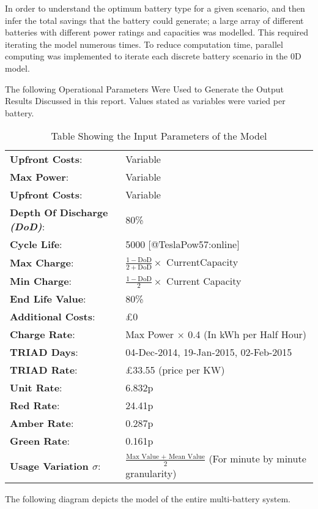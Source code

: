 In order to understand the optimum battery type for a given scenario,
and then infer the total savings that the battery could generate; a
large array of different batteries with different power ratings and
capacities was modelled. This required iterating the model numerous
times. To reduce computation time, parallel computing was implemented to
iterate each discrete battery scenario in the 0D model.

The following Operational Parameters Were Used to Generate the Output
Results Discussed in this report. Values stated as variables were varied
per battery.

\begin{table}[H]
\begin{tabular}{p{4.3cm}p{8cm}}
\textbf{Upfront Costs}:& Variable\\
\textbf{Max Power}:& Variable\\
\textbf{Upfront Costs}:& Variable\\
\textbf{Depth Of Discharge \textit{(DoD)}}:& 80\% \\
\textbf{Cycle Life}:& 5000 [@TeslaPow57:online]\\
\textbf{Max Charge}:& $\frac{1-\text{DoD}}{2+\text{DoD}} \times$ CurrentCapacity\\
\textbf{Min Charge}:& $\frac{1-\text{DoD}}{2} \times$ Current Capacity\\
\textbf{End Life Value}:& 80\%\\
\textbf{Additional Costs}:& £0 \\
\textbf{Charge Rate}:& Max Power $\times$ 0.4 (In kWh per Half Hour)\\
\textbf{TRIAD Days}:& 04-Dec-2014, 19-Jan-2015, 02-Feb-2015\\
\textbf{TRIAD Rate}:& £33.55  (price per KW)\\
\textbf{Unit Rate}:&  6.832p\\
\textbf{Red Rate}:&  24.41p\\
\textbf{Amber Rate}:&  0.287p\\
\textbf{Green Rate}:&  0.161p\\
\textbf{Usage Variation $\sigma$}:&  $\frac{\text{Max Value + Mean Value}}{2}$ (For minute by minute granularity)
\end{tabular}
\label{inputparam}
\caption{Table Showing the Input Parameters of the Model}
\end{table}

The following diagram depicts the model of the entire multi-battery
system.

